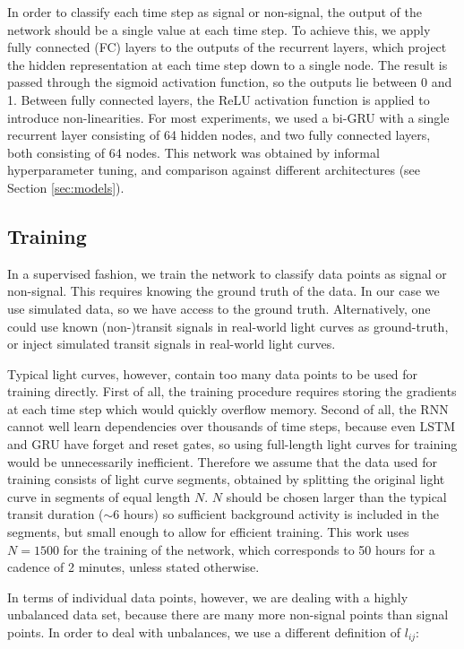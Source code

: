 In order to classify each time step as signal or non-signal, the output of the network should be a single value at each time step. To achieve this, we apply fully connected (FC) layers to the outputs of the recurrent layers, which project the hidden representation at each time step down to a single node. The result is passed through the sigmoid activation function, so the outputs lie between 0 and 1. Between fully connected layers, the ReLU activation function is applied to introduce non-linearities. For most experiments, we used a bi-GRU with a single recurrent layer consisting of 64 hidden nodes, and two fully connected layers, both consisting of 64 nodes. This network was obtained by informal hyperparameter tuning, and comparison against different architectures (see Section \ref{sec:models}).

\subsection{Training}
\label{sec:training}

In a supervised fashion, we train the network to classify data points as signal or non-signal. This requires knowing the ground truth of the data. In our case we use simulated data, so we have access to the ground truth. Alternatively, one could use known (non-)transit signals in real-world light curves as ground-truth, or inject simulated transit signals in real-world light curves. 

Typical light curves, however, contain too many data points to be used for training directly. First of all, the training procedure requires storing the gradients at each time step which would quickly overflow memory. Second of all, the RNN cannot well learn dependencies over thousands of time steps, because even LSTM and GRU have forget and reset gates, so using full-length light curves for training would be unnecessarily inefficient. Therefore we assume that the data used for training consists of light curve segments, obtained by splitting the original light curve in segments of equal length $N$. $N$ should be chosen larger than the typical transit duration ($\sim$6 hours) so sufficient background activity is included in the segments, but small enough to allow for efficient training. This work uses $N=1500$ for the training of the network, which corresponds to 50 hours for a cadence of 2 minutes, unless stated otherwise.



In terms of individual data points, however, we are dealing with a highly unbalanced data set, because there are many more non-signal points than signal points. In order to deal with unbalances, we use a different definition of $l_{ij}$:

